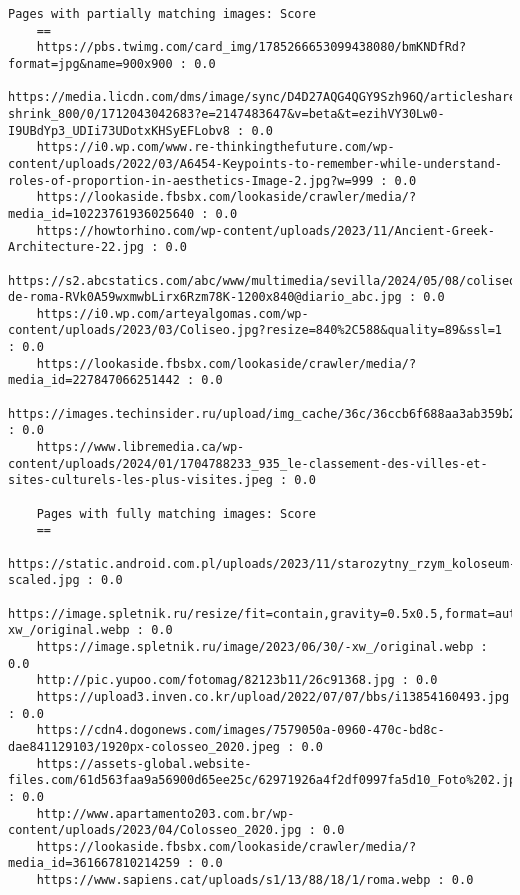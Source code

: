 \begin{lstlisting}[caption={Output vision api},label={lst:outputvisionapi}]
    Pages with partially matching images: Score
    ==
    https://pbs.twimg.com/card_img/1785266653099438080/bmKNDfRd?format=jpg&name=900x900 : 0.0
    https://media.licdn.com/dms/image/sync/D4D27AQG4QGY9Szh96Q/articleshare-shrink_800/0/1712043042683?e=2147483647&v=beta&t=ezihVY30Lw0-I9UBdYp3_UDIi73UDotxKHSyEFLobv8 : 0.0
    https://i0.wp.com/www.re-thinkingthefuture.com/wp-content/uploads/2022/03/A6454-Keypoints-to-remember-while-understand-roles-of-proportion-in-aesthetics-Image-2.jpg?w=999 : 0.0
    https://lookaside.fbsbx.com/lookaside/crawler/media/?media_id=10223761936025640 : 0.0
    https://howtorhino.com/wp-content/uploads/2023/11/Ancient-Greek-Architecture-22.jpg : 0.0
    https://s2.abcstatics.com/abc/www/multimedia/sevilla/2024/05/08/coliseo-de-roma-RVk0A59wxmwbLirx6Rzm78K-1200x840@diario_abc.jpg : 0.0
    https://i0.wp.com/arteyalgomas.com/wp-content/uploads/2023/03/Coliseo.jpg?resize=840%2C588&quality=89&ssl=1 : 0.0
    https://lookaside.fbsbx.com/lookaside/crawler/media/?media_id=227847066251442 : 0.0
    https://images.techinsider.ru/upload/img_cache/36c/36ccb6f688aa3ab359b22f8084f4cd41_cropped_510x357.jpg : 0.0
    https://www.libremedia.ca/wp-content/uploads/2024/01/1704788233_935_le-classement-des-villes-et-sites-culturels-les-plus-visites.jpeg : 0.0
    
    Pages with fully matching images: Score
    ==
    https://static.android.com.pl/uploads/2023/11/starozytny_rzym_koloseum-scaled.jpg : 0.0
    https://image.spletnik.ru/resize/fit=contain,gravity=0.5x0.5,format=auto,width=1011,height=700,dpr=2/https://image.spletnik.ru/image/2023/06/30/-xw_/original.webp : 0.0
    https://image.spletnik.ru/image/2023/06/30/-xw_/original.webp : 0.0
    http://pic.yupoo.com/fotomag/82123b11/26c91368.jpg : 0.0
    https://upload3.inven.co.kr/upload/2022/07/07/bbs/i13854160493.jpg : 0.0
    https://cdn4.dogonews.com/images/7579050a-0960-470c-bd8c-dae841129103/1920px-colosseo_2020.jpeg : 0.0
    https://assets-global.website-files.com/61d563faa9a56900d65ee25c/62971926a4f2df0997fa5d10_Foto%202.jpg : 0.0
    http://www.apartamento203.com.br/wp-content/uploads/2023/04/Colosseo_2020.jpg : 0.0
    https://lookaside.fbsbx.com/lookaside/crawler/media/?media_id=361667810214259 : 0.0
    https://www.sapiens.cat/uploads/s1/13/88/18/1/roma.webp : 0.0
    

\end{lstlisting}
